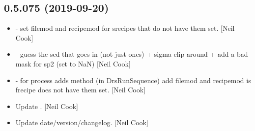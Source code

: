 \documentclass[a4paper,10pt,english]{report}
\begin{document}
\subsection{0.5.075 (2019-09-20)}
\label{\detokenize{misc/changelog:id68}}\begin{itemize}
\item {} 
 - set filemod and recipemod for
srecipes that do not have them set. {[}Neil Cook{]}

\item {} 
 - guess the sed that goes in (not just
ones) + sigma clip around  + add a bad mask for sp2 (set to NaN)
{[}Neil Cook{]}

\item {} 
 - for process adds method (in DrsRunSequence) add
filemod and recipemod is frecipe does not have them set. {[}Neil Cook{]}

\item {} 
Update . {[}Neil Cook{]}

\item {} 
Update date/version/changelog. {[}Neil Cook{]}

\end{itemize}
\end{document}
